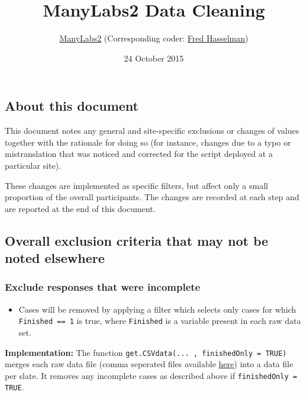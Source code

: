 \documentclass[]{article}
\title{ManyLabs2 Data Cleaning}
\author{\href{https://osf.io/8cd4r}{ManyLabs2} (Corresponding coder:
\href{https://osf.io/ujgs6/}{Fred Hasselman})}
\date{24 October 2015}
\begin{document}
\maketitle


{
\hypersetup{linkcolor=black}
\setcounter{tocdepth}{4}
\tableofcontents
}
\subsection{About this document}\label{about-this-document}

This document notes any general and site-specific exclusions or changes
of values together with the rationale for doing so (for instance,
changes due to a typo or mistranslation that was noticed and corrected
for the script deployed at a particular site).

These changes are implemented as specific filters, but affect only a
small proportion of the overall participants. The changes are recorded
at each step and are reported at the end of this document.

\subsection{Overall exclusion criteria that may not be noted
elsewhere}\label{overall-exclusion-criteria-that-may-not-be-noted-elsewhere}

\subsubsection{\textbf{Exclude} responses that were
incomplete}\label{exclude-responses-that-were-incomplete}

\begin{itemize}
\itemsep1pt\parskip0pt
\item
  Cases will be removed by applying a filter which selects only cases
  for which \texttt{Finished == 1} is true, where \texttt{Finished} is a
  variable present in each raw data set.
\end{itemize}

\textbf{Implementation:} The function
\texttt{get.CSVdata(... , finishedOnly = TRUE)} merges each raw data
file (comma seperated files available \href{}{here}) into a data file
per slate. It removes any incomplete cases as described above if
\texttt{finishedOnly = TRUE}.
\end{document}
